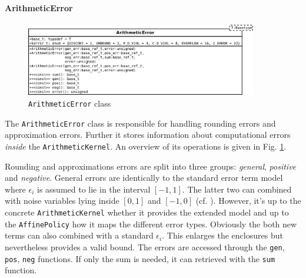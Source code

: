 \documentclass[a4]{scrartcl}
\newcommand{\iv}[2]{\ensuremath{[#1, #2]}\xspace}
\begin{document}
\paragraph{ArithmeticError}
\label{sec:arithmeticerror}
\begin{figure}[h]
  \centering
  \includegraphics[width=0.9\textwidth]{arithmeticerror}
  \caption{\texttt{ArithmeticError} class}
  \label{fig:arithmeticerror}
\end{figure}
The \texttt{ArithmeticError} class is responsible for handling rounding
errors and approximation errors. Further it stores information about
computational errors \emph{inside} the \texttt{ArithmeticKernel}. An overview
of its operations is given in Fig. \ref{fig:arithmeticerror}.

Rounding and approximations errors are split into three groups:
\emph{general}, \emph{positive} and \emph{negative}. General errors are
identically to the standard error term model where $\epsilon_i$ is assumed to
lie in the interval $\iv{-1}{1}$. The latter two can combined with noise
variables lying inside $\iv{0}{1}$ and $\iv{-1}{0}$
(cf. \cite{messine2002}). However, it's up to the concrete
\texttt{ArithmeticKernel} whether it provides the extended model and up to the
\texttt{AffinePolicy} how it maps the different error types. Obviously the
both new terms can also combined with a standard $\epsilon_i$. This enlarges
the enclosures but nevertheless provides a valid bound. The errors are
accessed through the \texttt{gen}, \texttt{pos}, \texttt{neg} functions. If
only the sum is needed, it can retrieved with the \texttt{sum} function.
\end{document}
